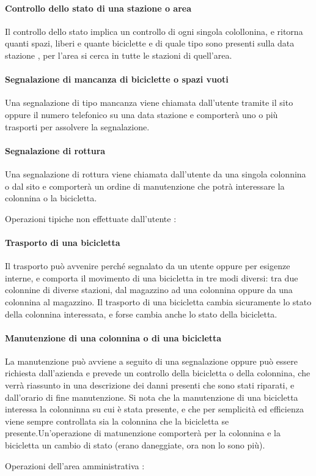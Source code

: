 \documentclass[a4paper,twoside]{article}
\begin{document}
\paragraph{Controllo dello stato di una stazione o area} Il controllo dello stato implica un controllo di ogni singola colollonina, e ritorna quanti spazi, liberi e quante biciclette e di quale tipo sono presenti sulla data stazione , per l'area si cerca in tutte le stazioni di quell'area.
\paragraph{Segnalazione di mancanza di biciclette o spazi vuoti} Una segnalazione di tipo mancanza viene chiamata dall'utente tramite il sito oppure il numero telefonico su una data stazione e comporterà uno o più trasporti per assolvere la segnalazione.
\paragraph{Segnalazione di rottura} Una segnalazione di rottura viene chiamata dall'utente da una singola colonnina o dal sito e comporterà un ordine di manutenzione che potrà interessare la colonnina o la bicicletta.
\par Operazioni tipiche non effettuate dall'utente :
\paragraph{Trasporto di una bicicletta} Il trasporto può avvenire perché segnalato da un utente oppure per esigenze interne, e comporta il movimento di una bicicletta in tre modi diversi: tra due colonnine di diverse stazioni, dal magazzino ad una colonnina oppure da una colonnina al magazzino. Il trasporto di una bicicletta cambia sicuramente lo stato della colonnina interessata, e forse cambia anche lo stato della bicicletta.
\paragraph{Manutenzione di una colonnina o di una bicicletta} La manutenzione può avviene a seguito di una segnalazione oppure può essere richiesta dall'azienda e prevede un controllo della bicicletta o della colonnina, che verrà riassunto in una descrizione dei danni presenti che sono stati riparati, e dall'orario di fine manutenzione. Si nota che la manutenzione di una bicicletta interessa la colonninna su cui è stata presente, e che per semplicità ed efficienza viene sempre controllata sia la colonnina che la bicicletta se presente.Un'operazione di matunenzione comporterà per la colonnina e la bicicletta un cambio di stato (erano daneggiate, ora non lo sono più).
\par Operazioni dell'area amministrativa :
\end{document}
